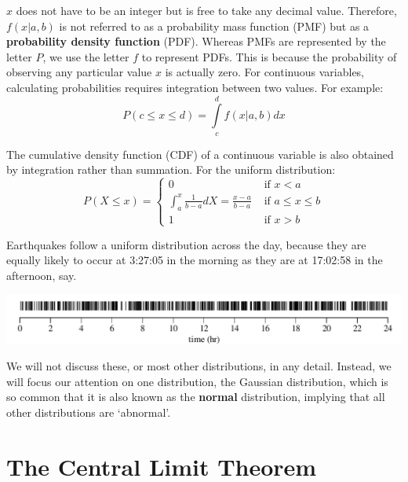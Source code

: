 \begin{itemize}
  $x$ does not have to be an integer but is free to take any decimal
  value. Therefore, $f(x|a,b)$ is not referred to as a probability
  mass function (PMF) but as a \textbf{probability density function}
  (PDF). Whereas PMFs are represented by the letter $P$, we use the
  letter $f$ to represent PDFs.  This is because the probability of
  observing any particular value $x$ is actually zero. For continuous
  variables, calculating probabilities requires integration between
  two values. For example:
  \begin{equation}
    P({c}\leq{x}\leq{d}) = \int\limits_{c}^{d} f(x|a,b) dx
  \end{equation}

  The cumulative density function (CDF) of a continuous variable is
  also obtained by integration rather than summation. For the uniform
  distribution:
  \begin{equation}
    P(X\leq{x}) =
    \begin{cases}
      0 & \mbox{~if~} x < a\\
      \int_{a}^{x} \frac{1}{b-a} dX = \frac{x-a}{b-a} & \mbox{~if~} a \leq x \leq b\\
      1 & \mbox{~if~} x > b
    \end{cases}
  \end{equation}

  Earthquakes follow a uniform distribution across the day, because
  they are equally likely to occur at 3:27:05 in the morning as they
  are at 17:02:58 in the afternoon, say.

\noindent\includegraphics[width=\linewidth]{../figures/quakerug.pdf}
\begingroup {}
\endgroup
  
\end{itemize}

We will not discuss these, or most other distributions, in any detail.
Instead, we will focus our attention on one distribution, the Gaussian
distribution, which is so common that it is also known as the
\textbf{normal} distribution, implying that all other distributions
are `abnormal'.

\section{The Central Limit Theorem}
\label{sec:CLT}

